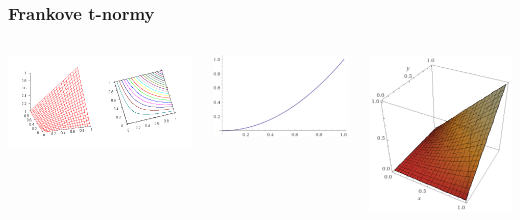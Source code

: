 \documentclass{beamer}
\begin{document}
\begin{frame}
\frametitle{Frankove t-normy}
\begin{columns}
\begin{minipage}[c][0.4\textheight][c]{\linewidth}
  \centering
  \includegraphics[width=1.1\linewidth]{ProductTnorm}
\end{minipage}
\begin{minipage}[c][0.4\textheight][c]{\linewidth}
  \centering
  \includegraphics[width=0.7\linewidth]{prodDiag}
\end{minipage}
\begin{minipage}[c][0.4\textheight][c]{\linewidth}
  \centering
  \includegraphics[width=0.5\linewidth]{FT/FT7}

\end{minipage}
\end{columns}
\end{frame}
\end{document}
